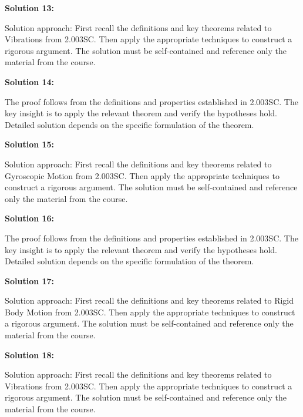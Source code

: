 \documentclass[12pt,a4paper]{exam}
\begin{document}
\vspace{0.5cm}

\textbf{Solution 13:}

Solution approach: First recall the definitions and key theorems related to Vibrations from 2.003SC. Then apply the appropriate techniques to construct a rigorous argument. The solution must be self-contained and reference only the material from the course.

\vspace{0.5cm}

\textbf{Solution 14:}

The proof follows from the definitions and properties established in 2.003SC. The key insight is to apply the relevant theorem and verify the hypotheses hold. Detailed solution depends on the specific formulation of the theorem.

\vspace{0.5cm}

\textbf{Solution 15:}

Solution approach: First recall the definitions and key theorems related to Gyroscopic Motion from 2.003SC. Then apply the appropriate techniques to construct a rigorous argument. The solution must be self-contained and reference only the material from the course.

\vspace{0.5cm}

\textbf{Solution 16:}

The proof follows from the definitions and properties established in 2.003SC. The key insight is to apply the relevant theorem and verify the hypotheses hold. Detailed solution depends on the specific formulation of the theorem.

\vspace{0.5cm}

\textbf{Solution 17:}

Solution approach: First recall the definitions and key theorems related to Rigid Body Motion from 2.003SC. Then apply the appropriate techniques to construct a rigorous argument. The solution must be self-contained and reference only the material from the course.

\vspace{0.5cm}

\textbf{Solution 18:}

Solution approach: First recall the definitions and key theorems related to Vibrations from 2.003SC. Then apply the appropriate techniques to construct a rigorous argument. The solution must be self-contained and reference only the material from the course.
\end{document}

